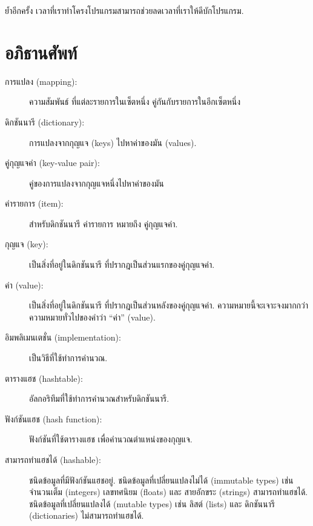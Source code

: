 ย้ำอีกครั้ง เวลาที่เราทำโครงโปรแกรมสามารถช่วยลดเวลาที่เราให้ดีบักโปรแกรม.


\section{อภิธานศัพท์}

\begin{description}

\item[การแปลง (mapping):] ความสัมพันธ์ ที่แต่ละรายการในเซ็ตหนึ่ง คู่กันกับรายการในอีกเซ็ตหนึ่ง

\item[ดิกชันนารี (dictionary):] 
การแปลงจากกุญแจ (keys) ไปหาค่าของมัน (values).

\item[คู่กุญแจค่า (key-value pair):] 
คู่ของการแปลงจากกุญแจหนึ่งไปหาค่าของมัน

\item[ค่ารายการ (item):] สำหรับดิกชันนารี ค่ารายการ หมายถึง คู่กุญแจค่า.

\item[กุญแจ (key):] เป็นสิ่งที่อยู่ในดิกชันนารี ที่ปรากฎเป็นส่วนแรกของคู่กุญแจค่า.

\item[ค่า (value):] เป็นสิ่งที่อยู่ในดิกชันนารี ที่ปรากฎเป็นส่วนหลังของคู่กุญแจค่า.
ความหมายนี้จะเจาะจงมากกว่าความหมายทั่วไปของคำว่า ``ค่า'' (value).

\item[อิมพลิเมนเตชั่น (implementation):] เป็นวิธีที่ใช้ทำการคำนวณ.

\item[ตารางแฮช (hashtable):] อัลกอริทึมที่ใช้ทำการคำนวณสำหรับดิกชันนารี.

\item[ฟังก์ชันแฮช (hash function):] ฟังก์ชันที่ใช้ตารางแฮช เพื่อคำนวณตำแหน่งของกุญแจ.

\item[สามารถทำแฮชได้ (hashable):] ชนิดข้อมูลที่มีฟังก์ชันแฮชอยู่.  
ชนิดข้อมูลที่เปลี่ยนแปลงไม่ได้ (immutable types) เช่น
จำนวนเต็ม (integers)
เลขทศนิยม (floats)
และ สายอักขระ (strings) สามารถทำแฮชได้.
ชนิดข้อมูลที่เปลี่ยนแปลงได้ (mutable types) เช่น ลิสต์ (lists) และ
ดิกชันนารี (dictionaries) ไม่สามารถทำแฮชได้.


\end{description}
